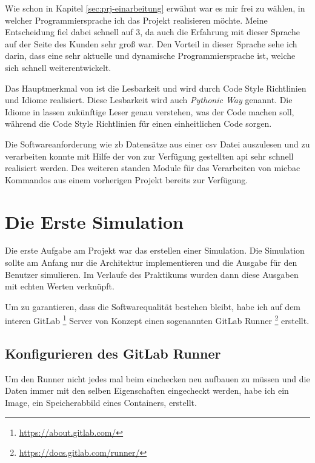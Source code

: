 Wie schon in Kapitel \ref{sec:prj-einarbeitung} erwähnt war es mir frei zu wählen, in welcher
Programmiersprache ich das Projekt realisieren möchte. Meine Entscheidung fiel dabei schnell
auf \cite{Python} 3, da auch die Erfahrung mit dieser Sprache auf der Seite des Kunden sehr 
groß war. Den Vorteil in dieser Sprache sehe ich darin, dass \cite{Python} eine sehr aktuelle 
und dynamische Programmiersprache ist, welche sich schnell weiterentwickelt. 

Das Hauptmerkmal von \cite{Python} ist die Lesbarkeit und wird durch Code Style Richtlinien und
Idiome realisiert. Diese Lesbarkeit wird auch \textit{Pythonic Way} genannt. Die Idiome in
\cite{Python} lassen zukünftige Leser genau verstehen, was der Code machen soll, während die
Code Style Richtlinien für einen einheitlichen Code sorgen.

Die Softwareanforderung wie \ac{zb} Datensätze aus einer \ac{csv} Datei auszulesen und zu 
verarbeiten konnte mit Hilfe der von \cite{Python} zur Verfügung gestellten \ac{api} sehr 
schnell realisiert werden. Des weiteren standen \cite{Python} Module für das Verarbeiten von 
\ac{micbac} Kommandos aus einem vorherigen Projekt bereits zur Verfügung.


\section{Die Erste Simulation}
\label{sec:first_simulation}

Die erste Aufgabe am Projekt war das erstellen einer Simulation. Die Simulation sollte am 
Anfang nur die Architektur implementieren und die Ausgabe für den Benutzer simulieren. Im 
Verlaufe des Praktikums wurden dann diese Ausgaben mit echten Werten verknüpft.

Um zu garantieren, dass die Softwarequalität bestehen bleibt, habe ich auf dem interen GitLab
\footnote{\url{https://about.gitlab.com/}} Server von Konzept einen sogenannten GitLab Runner
\footnote{\url{https://docs.gitlab.com/runner/}} erstellt. 


\subsection{Konfigurieren des GitLab Runner}
\label{subsec:gitlab_runner}

Um den Runner nicht jedes mal beim einchecken neu aufbauen zu müssen und die Daten immer mit 
den selben Eigenschaften eingecheckt werden, habe ich ein \cite{Docker} Image, ein 
Speicherabbild eines Containers, erstellt.

